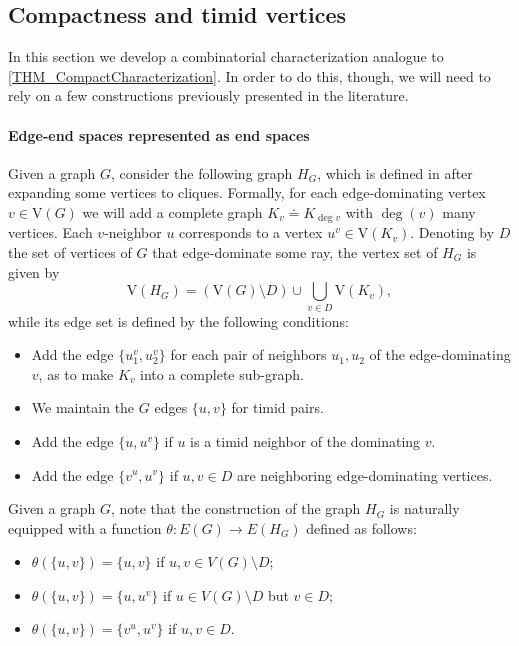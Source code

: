 \documentclass[10pt]{article}
\newcommand{\myref}[1]{\hyperref[#1]{\namecref{#1} \ref{#1}}}
\numberwithin{equation}{subsection}
\theoremstyle{remark}
\begin{document}
\subsection{Compactness and timid vertices}
\label{covering}

In this section we develop a combinatorial characterization analogue to \myref{THM_CompactCharacterization}. In order to do this, though, we will need to rely on a few constructions previously presented in the literature.

\paragraph{Edge-end spaces represented as end spaces} Given a graph $G$, consider the following graph $H_G$, which is defined in \cite{aurichi2024topologicalremarksendedgeend} after expanding some vertices to cliques. Formally, for each edge-dominating vertex $v\in \mathrm{V}(G)$ we will add a complete graph $K_v \doteq K_{\deg{v}}$ with $\deg(v)$ many vertices. Each $v$-neighbor $u$ corresponds to a vertex $u^v \in\mathrm{V}(K_v)$. Denoting by $D$ the set of vertices of $G$ that edge-dominate some ray, the vertex set of $H_G$ is given by \[\mathrm{V}(H_G) = (\mathrm{V}(G)\setminus D) \cup\displaystyle \bigcup_{v\in D}\mathrm{V}(K_v),\] while its edge set is defined by the following conditions:
\begin{itemize}
    \item[(i)] Add the edge $\{u_1^v,u_2^v\}$ for each pair of neighbors $u_1,u_2$ of the edge-dominating $v$, as to make $K_v$ into a complete sub-graph.
    \item[(ii)] We maintain the $G$ edges $\{u,v\}$ for timid pairs.
    \item[(iii)] Add the edge $\{u,u^v\}$ if $u$ is a timid neighbor of the dominating $v$.
    \item[(iv)] Add the edge $\{v^u,u^v\}$ if $u,v \in D$ are neighboring edge-dominating vertices.
\end{itemize}

Given a graph $G$, note that the construction of the graph $H_G$ is naturally equipped with a function $\theta: E(G) \longrightarrow E(H_G)$ defined as follows:

\begin{itemize}
        \item $\theta(\lbrace u,v\rbrace) = \lbrace u, v\rbrace$ if $u,v \in V(G)\setminus D$;
        \item $\theta(\lbrace u, v\rbrace) = \lbrace u, u^v\rbrace$ if $u\in V(G)\setminus D$ but $v \in D$;
        \item $\theta(\lbrace u, v\rbrace) = \lbrace v^u, u^v\rbrace$ if $u,v \in D$.
    \end{itemize}
\end{document}
